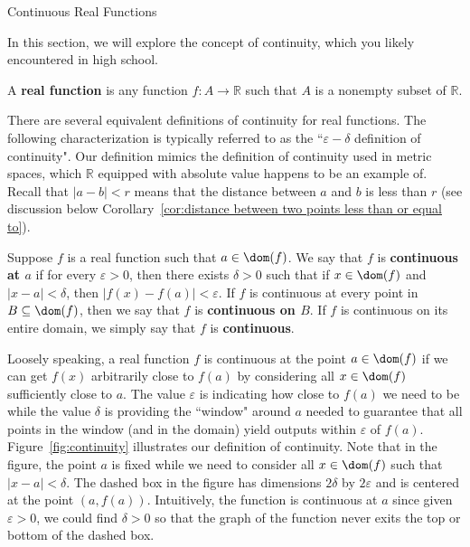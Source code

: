 \begin{section}{Continuous Real Functions}\label{sec:Continuity}

In this section, we will explore the concept of continuity, which you likely encountered in high school.

\begin{definition}
A \textbf{real function} is any function $f:A\to \mathbb{R}$ such that $A$ is a nonempty subset of $\mathbb{R}$. 
\end{definition}

There are several equivalent definitions of continuity for real functions.  The following characterization is typically referred to as the ``$\varepsilon-\delta$ definition of continuity". Our definition mimics the definition of continuity used in metric spaces, which $\mathbb{R}$ equipped with absolute value happens to be an example of.  Recall that $|a-b|<r$ means that the distance between $a$ and $b$ is less than $r$ (see discussion below Corollary~\ref{cor:distance between two points less than or equal to}).

\begin{definition}\label{def:continuity}
Suppose $f$ is a real function such that $a\in \dom(f)$. We say that $f$ is \textbf{continuous at $a$} if for every $\varepsilon>0$, then there exists $\delta>0$ such that if $x\in\dom(f)$ and $|x-a|<\delta$, then $|f(x)-f(a)|<\varepsilon$. If $f$ is continuous at every point in $B\subseteq\dom(f)$, then we say that $f$ is \textbf{continuous on $B$}. If $f$ is continuous on its entire domain, we simply say that $f$ is \textbf{continuous}.
\end{definition}


Loosely speaking, a real function $f$ is continuous at the point $a\in\dom(f)$ if we can get $f(x)$ arbitrarily close to $f(a)$ by considering all $x\in\dom(f)$ sufficiently close to $a$.  The value $\varepsilon$ is indicating how close to $f(a)$ we need to be while the value $\delta$ is providing the ``window" around $a$ needed to guarantee that all points in the window (and in the domain) yield outputs within $\varepsilon$ of $f(a)$. Figure~\ref{fig:continuity} illustrates our definition of continuity. Note that in the figure, the point $a$ is fixed while we need to consider all $x\in\dom(f)$ such that $|x-a|<\delta$. The dashed box in the figure has dimensions $2\delta$ by $2\varepsilon$ and is centered at the point $(a,f(a))$.  Intuitively, the function is continuous at $a$ since given $\varepsilon>0$, we could find $\delta >0$ so that the graph of the function never exits the top or bottom of the dashed box.


\end{section}
